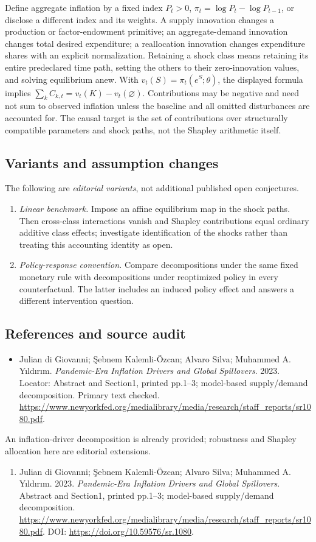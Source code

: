 \documentclass[11pt,a4paper]{article}
\begin{document}
Define aggregate inflation by a fixed index \(P_t>0\), \(\pi_t=\log P_t-\log P_{t-1}\), or disclose a different index and its weights. A supply innovation changes a production or factor-endowment primitive; an aggregate-demand innovation changes total desired expenditure; a reallocation innovation changes expenditure shares with an explicit normalization. Retaining a shock class means retaining its entire predeclared time path, setting the others to their zero-innovation values, and solving equilibrium anew. With \(v_t(S)=\pi_t(e^S;\theta)\), the displayed formula implies \(\sum_kC_{k,t}=v_t(K)-v_t(\varnothing)\). Contributions may be negative and need not sum to observed inflation unless the baseline and all omitted disturbances are accounted for. The causal target is the set of contributions over structurally compatible parameters and shock paths, not the Shapley arithmetic itself.
\subsection*{Variants and assumption changes}
The following are \emph{editorial variants}, not additional published open conjectures.
\begin{enumerate}
\item \emph{Linear benchmark.} Impose an affine equilibrium map in the shock paths. Then cross-class interactions vanish and Shapley contributions equal ordinary additive class effects; investigate identification of the shocks rather than treating this accounting identity as open.
\item \emph{Policy-response convention.} Compare decompositions under the same fixed monetary rule with decompositions under reoptimized policy in every counterfactual. The latter includes an induced policy effect and answers a different intervention question.
\end{enumerate}
\subsection*{References and source audit}
\begin{itemize}
\item Julian di Giovanni; \c{S}ebnem Kalemli-\"{O}zcan; Alvaro Silva; Muhammed A. Y\i{}ld\i{}r\i{}m. \emph{Pandemic-Era Inflation Drivers and Global Spillovers}. 2023. Locator: Abstract and Section1, printed pp.1--3; model-based supply/demand decomposition. Primary text checked. \url{https://www.newyorkfed.org/medialibrary/media/research/staff_reports/sr1080.pdf}.
\end{itemize}
An inflation-driver decomposition is already provided; robustness and Shapley allocation here are editorial extensions.
\begin{enumerate}\raggedright
\item\hypertarget{definitions:source:30007522:1}{} Julian di Giovanni; \c{S}ebnem Kalemli-\"{O}zcan; Alvaro Silva; Muhammed A. Y\i{}ld\i{}r\i{}m. 2023. \emph{Pandemic-Era Inflation Drivers and Global Spillovers}. Abstract and Section1, printed pp.1--3; model-based supply/demand decomposition.
\url{https://www.newyorkfed.org/medialibrary/media/research/staff_reports/sr1080.pdf}.
DOI: \url{https://doi.org/10.59576/sr.1080}.
\end{enumerate}
\end{document}

